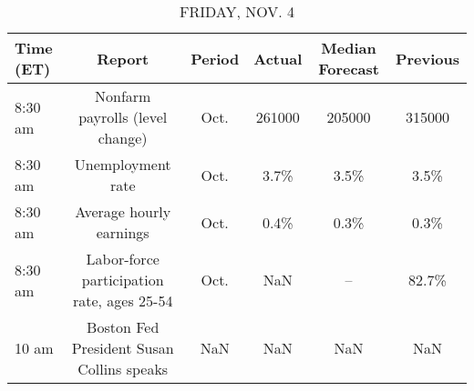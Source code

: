 \documentclass{article}%
\begin{document}
%


\begin{table}[htbp]%
\caption{FRIDAY, NOV. 4}%
\centering%
\begin{adjustbox}{width=1\textwidth}%
\begin{tabular}{lccccc}
\toprule
Time (ET) &                                     Report & Period & Actual & Median Forecast & Previous \\
\midrule
  8:30 am &            Nonfarm payrolls (level change) &   Oct. & 261000 &          205000 &   315000 \\
  8:30 am &                          Unemployment rate &   Oct. &   3.7\% &            3.5\% &     3.5\% \\
  8:30 am &                    Average hourly earnings &   Oct. &   0.4\% &            0.3\% &     0.3\% \\
  8:30 am & Labor-force participation rate, ages 25-54 &   Oct. &    NaN &              -- &    82.7\% \\
    10 am &  Boston Fed President Susan Collins speaks &    NaN &    NaN &             NaN &      NaN \\
\bottomrule
\end{tabular}
%
\end{adjustbox}%
\end{table}
\end{document}
